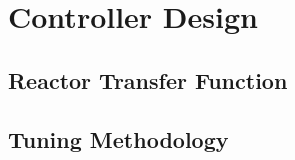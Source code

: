 \chapter{Controller Design}
\label{Chapter:Design}

\section{Reactor Transfer Function}

\section{Tuning Methodology}
